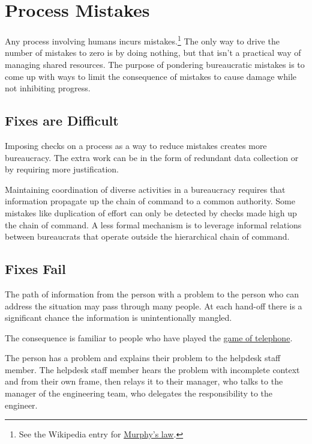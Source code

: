 \section{Process Mistakes\label{sec:process-mistakes}}

Any process involving humans incurs mistakes.\footnote{See the Wikipedia entry for \href{https://en.wikipedia.org/wiki/Murphy\%27s_law}{Murphy's law}.
} The only way to drive the number of mistakes to zero is by doing nothing, but that isn't a practical way of managing shared resources. 
The purpose of pondering bureaucratic mistakes is to come up with ways to limit the consequence of mistakes to cause damage while not inhibiting progress. 

\subsection*{Fixes are Difficult}
Imposing checks on a process as a way to  reduce mistakes creates more bureaucracy. The extra work can be in the form of redundant data collection or by requiring more justification. 

Maintaining coordination of diverse activities in a bureaucracy requires that information propagate up the chain of command to a common authority. Some mistakes like duplication of effort can only be detected by checks made high up the chain of command. A less formal mechanism is to leverage informal relations between bureaucrats that operate outside the hierarchical chain of command. 


\subsection*{Fixes Fail}
The path of information from the person with a problem to the person who can address the situation may pass through many people. At each hand-off there is a significant chance the information is unintentionally mangled. 

The consequence is familiar to people who have played the \href{https://en.wikipedia.org/wiki/Chinese_whispers\%23Game}{game of telephone}.
\begin{mdframed}[frametitle={Game of Telephone},frametitlerule=true,frametitlealignment=\centering]
The person has a problem and explains their problem to the helpdesk staff member. The helpdesk staff member hears the problem with incomplete context and from their own frame, then relays it to their manager, who talks to the manager of the engineering team, who delegates the responsibility to the engineer. 
\end{mdframed}

